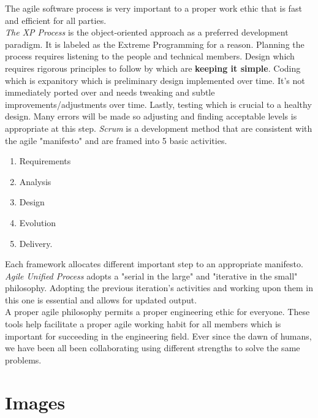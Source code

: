 \documentclass[12pt]{article}
\begin{document}
The agile software process is very important to a proper work ethic that is fast and efficient for all parties.\\
\indent
\emph{The XP Process} is the object-oriented approach as a preferred development paradigm. It is labeled as the Extreme Programming for a reason. Planning the process requires listening to the people and technical members. Design which requires rigorous principles to follow by which are \textbf{keeping it simple}. Coding which is expanitory which is preliminary design implemented over time. It's not immediately ported over and needs tweaking and subtle improvements/adjustments over time. Lastly, testing which is crucial to a healthy design. Many errors will be made so adjusting and finding acceptable levels is appropriate at this step.
\emph{Scrum} is a development method that are consistent with the agile "manifesto" and are framed into 5 basic activities.
    \begin{enumerate}
        \item Requirements
        \item Analysis
        \item Design
        \item Evolution
        \item Delivery.
    \end{enumerate}
Each framework allocates different important step to an appropriate manifesto.
\emph{Agile Unified Process} adopts a "serial in the large" and "iterative in the small" philosophy. Adopting the previous iteration's activities and working upon them in this one is essential and allows for updated output.\\
\indent
A proper agile philosophy permits a proper engineering ethic for everyone. These tools help facilitate a proper agile working habit for all members which is important for succeeding in the engineering field. Ever since the dawn of humans, we have been all been collaborating using different strengths to solve the same problems.

\newpage

\section{Images}
\end{document}
